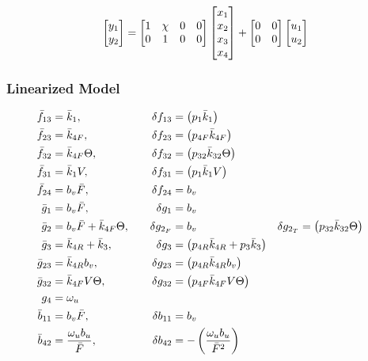 \begin{equation}\label{eqn::ctrl_out}
    \begin{bmatrix} y_1 \\ y_2 \end{bmatrix} = \begin{bmatrix} 1 & \chi & 0 & 0 \\
                                 0 & 1       & 0 & 0 \end{bmatrix}
                            \begin{bmatrix} x_1 \\ x_2 \\ x_3 \\ x_4 \end{bmatrix} +
                            \begin{bmatrix} 0 & 0 \\
                                0 & 0 \\ \end{bmatrix}
                            \begin{bmatrix} u_1 \\ u_2 \end{bmatrix}
\end{equation}


\subsubsection{Linearized Model}
\begin{align*}
     \bar f_{13} &= \bar k_{1}, \quad&
    \delta f_{13} &= \left(  p_{1} \bar k_{1}  \right) \\
     \bar f_{23} &= \bar k_{4F}, \quad &
    \delta f_{23}  &= \left(  p_{4F} \bar k_{4F}  \right) \\
     \bar f_{32} &= \bar k_{4F} \Theta, \quad &
    \delta f_{32}  &= \left(  p_{32}  \bar k_{32} \Theta  \right)
    \\
     \bar f_{31} &= \bar k_1 V, \quad &
    \delta f_{31}  &= \left(  p_1 \bar k_1 V  \right)
    \\
     \bar f_{24} &= b_v \bar F,
    \quad &
    \delta f_{24}  &= b_v
    \\
     \bar g_1 &= b_v \bar F,
    \quad &
    \delta g_1  &= b_v
    \\
    \bar g_2 &= b_v \bar F + \bar k_{4F} \Theta,
    \quad &
    \delta g_{2_F}  &= b_v
    \quad &
    \delta g_{2_T} &= \left(  p_{32}  \bar k_{32}  \Theta  \right)
    \\
    \bar g_3 &= \bar k_{4R} + \bar k_3,
    \quad &
    \delta g_3 &= \left(  p_{4R} \bar k_{4R} + p_3 \bar k_3 \right)
    \\
    \bar g_{23} &= \bar k_{4R} b_v,
    \quad &
    \delta g_{23}  &= \left(  p_{4R} \bar k_{4R} b_v  \right)
    \\
    \bar g_{32} &= \bar k_{4F} V \Theta,
    \quad &
    \delta g_{32}  &= \left(  p_{4F} \bar k_{4F} V \Theta  \right)
    \\
    g_4 &= \omega_u
    \\
    \bar b_{11} &= b_v \bar F,
    \quad &
    \delta b_{11} &= b_v
    \\
    \bar b_{42} &= \frac{\omega_u b_u}{\bar F},
    \quad &
    \delta b_{42}  &= -\left( \frac{\omega_u b_u}{\bar F^2} \right)
\end{align*}


